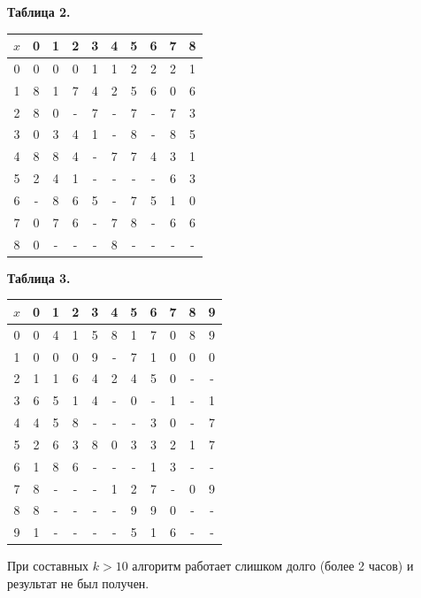 \documentclass[oneside,final,14pt]{extreport}
\begin{document}
\centerline{\bf Таблица 2.}
\begin{center}
\begin{tabular}{|c|c|c|c|c|c|c|c|c|c|}
\hline \(x\) & 0 & 1 & 2 & 3 & 4 & 5 & 6 & 7 & 8 \\ \hline
0 & 0 & 0 & 0 & 1 & 1 & 2 & 2 & 2 & 1 \\ \hline 
1 & 8 & 1 & 7 & 4 & 2 & 5 & 6 & 0 & 6 \\ \hline
2 & 8 & 0 & - & 7 & - & 7 & - & 7 & 3 \\ \hline
3 & 0 & 3 & 4 & 1 & - & 8 & - & 8 & 5 \\ \hline
4 & 8 & 8 & 4 & - & 7 & 7 & 4 & 3 & 1 \\ \hline
5 & 2 & 4 & 1 & - & - & - & - & 6 & 3 \\ \hline
6 & - & 8 & 6 & 5 & - & 7 & 5 & 1 & 0 \\ \hline
7 & 0 & 7 & 6 & - & 7 & 8 & - & 6 & 6 \\ \hline
8 & 0 & - & - & - & 8 & - & - & - & - \\ \hline
\end{tabular}
\end{center}


\centerline{\bf Таблица 3.}
\begin{center}
\begin{tabular}{|c|c|c|c|c|c|c|c|c|c|c|}
\hline \(x\) & 0 & 1 & 2 & 3 & 4 & 5 & 6 & 7 & 8 & 9 \\ \hline
0 & 0 & 4 & 1 & 5 & 8 & 1 & 7 & 0 & 8 & 9 \\ \hline 
1 & 0 & 0 & 0 & 9 & - & 7 & 1 & 0 & 0 & 0 \\ \hline 
2 & 1 & 1 & 6 & 4 & 2 & 4 & 5 & 0 & - & - \\ \hline 
3 & 6 & 5 & 1 & 4 & - & 0 & - & 1 & - & 1 \\ \hline 
4 & 4 & 5 & 8 & - & - & - & 3 & 0 & - & 7 \\ \hline 
5 & 2 & 6 & 3 & 8 & 0 & 3 & 3 & 2 & 1 & 7 \\ \hline 
6 & 1 & 8 & 6 & - & - & - & 1 & 3 & - & - \\ \hline 
7 & 8 & - & - & - & 1 & 2 & 7 & - & 0 & 9 \\ \hline 
8 & 8 & - & - & - & - & 9 & 9 & 0 & - & - \\ \hline 
9 & 1 & - & - & - & - & 5 & 1 & 6 & - & - \\ \hline 
\end{tabular}
\end{center}

При составных \(k > 10\) алгоритм работает слишком долго (более 2 часов) и результат не был получен.
\end{document}
